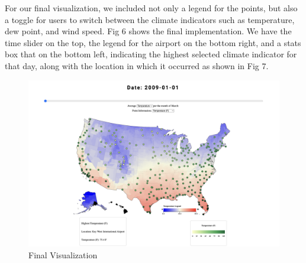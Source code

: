 \documentclass[10pt,twocolumn,twoside]{opticajnl}
\begin{document}
For our final visualization, we included not only a legend for the points, but also a toggle for users to switch between the climate indicators such as temperature, dew point, and wind speed. Fig 6 shows the final implementation. We have the time slider on the top, the legend for the airport on the bottom right, and a stats box that on the bottom left, indicating the highest selected climate indicator for that day, along with the location in which it occurred as shown in Fig 7.

\begin{figure}
    \centering
    \includegraphics[scale=0.15]{images/img7.png}
    \caption{Final Visualization}


\end{figure}
\end{document}
